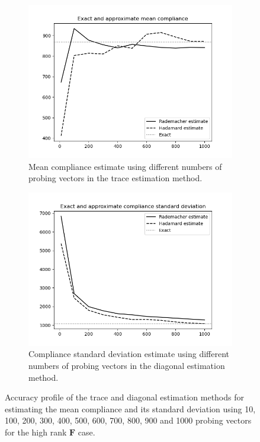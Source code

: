     \begin{figure}
      \begin{subfigure}[t]{0.45\textwidth}
        \centering
        \includegraphics[width=1\textwidth]{./images/robust_approx/results_2d_high_rank_figures/exact_approx_mean.png}
        \caption{Mean compliance estimate using different numbers of probing vectors in the trace estimation method.}
        \label{fig:exact_approx_mean_high_rank}
      \end{subfigure} \hfill
      \begin{subfigure}[t]{0.45\textwidth}
        \centering
        \includegraphics[width=1\textwidth]{./images/robust_approx/results_2d_high_rank_figures/exact_approx_std.png}
        \caption{Compliance standard deviation estimate using different numbers of probing vectors in the diagonal estimation method.}
        \label{fig:exact_approx_std_high_rank}
      \end{subfigure}
      \caption{Accuracy profile of the trace and diagonal estimation methods for estimating the mean compliance and its standard deviation using 10, 100, 200, 300, 400, 500, 600, 700, 800, 900 and 1000 probing vectors for the high rank $\bm{F}$ case.}
      \label{fig:exact_approx_high_rank}
    \end{figure}

